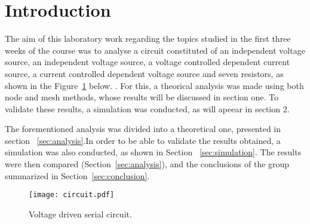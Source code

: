 \section{Introduction}
\label{sec:introduction}

The aim of this laboratory work regarding the topics studied in the first three weeks of the course was to analyse a circuit constituted of an independent voltage source, an independent voltage source, a voltage controlled dependent current source, a current controlled dependent voltage source and seven resistors, as shown in the Figure~\ref{fig:circuit} below.
. For this, a theorical analysis was made using both node and mesh methods, whose results will be discussed in section one. To validate these results, a simulation was conducted, as will apeear in section 2.

\lipsum[1-1]

The forementioned analysis was divided into a theoretical one, presented in section ~\ref{sec:analysis}.In order to be able to validate the results obtained, a simulation was also conducted, as shown in Section ~\ref{sec:simulation}. The results were then compared (Section~\ref{sec:analysis}), and the conclusions of the group summarized in Section~\ref{sec:conclusion}.


\begin{figure}[h] \centering
\texttt{[image: circuit.pdf]}
\caption{Voltage driven serial circuit.}
\label{fig:circuit}
\end{figure}

